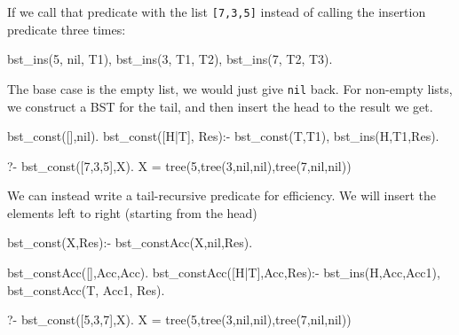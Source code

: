 If we call that predicate with the list \texttt{[7,3,5]} instead of calling the insertion predicate three times:
\begin{codeblock}
bst_ins(5, nil, T1), bst_ins(3, T1, T2), bst_ins(7, T2, T3).
\end{codeblock}

The base case is the empty list, we would just give \texttt{nil} back. For non-empty lists, we construct a BST for the tail, and then insert the head to the result we get.

\begin{codeblock}
bst_const([],nil).
bst_const([H|T], Res):-
    bst_const(T,T1),
    bst_ins(H,T1,Res).
\end{codeblock}

\begin{codeblock}
?- bst_const([7,3,5],X).
X = tree(5,tree(3,nil,nil),tree(7,nil,nil))
\end{codeblock}

\begin{excursion}{}
We can instead write a tail-recursive predicate for efficiency. We will insert the elements left to right (starting from the head)

\begin{codeblock}
bst_const(X,Res):- 
    bst_constAcc(X,nil,Res).

bst_constAcc([],Acc,Acc).
bst_constAcc([H|T],Acc,Res):-
    bst_ins(H,Acc,Acc1),
    bst_constAcc(T, Acc1, Res).
\end{codeblock}

\begin{codeblock}
?- bst_const([5,3,7],X).
X = tree(5,tree(3,nil,nil),tree(7,nil,nil))
\end{codeblock}
\end{excursion}